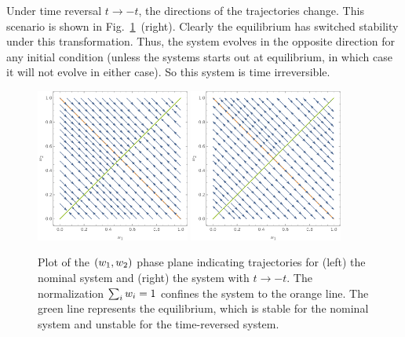 {	Under time reversal $t \to -t$, the directions of the trajectories change.  This scenario is shown in Fig.~\ref{pplane}~(right).  Clearly the equilibrium has switched stability under this transformation.  Thus, the system evolves in the opposite direction for any initial condition (unless the systems starts out at equilibrium, in which case it will not evolve in either case).  So this system is time irreversible.
	
	\begin{figure} \centering
		\includegraphics[width=0.45\textwidth]{1-1(a)} \hfill
		\includegraphics[width=0.45\textwidth]{1-1(b)}
		\caption{Plot of the $(w_1, w_2)$ phase plane indicating trajectories for (left) the nominal system and (right) the system with $t \to -t$.  The normalization $\sum_i w_i = 1$ confines the system to the orange line.  The green line represents the equilibrium, which is stable for the nominal system and unstable for the time-reversed system.}
		\label{pplane}
	\end{figure}
	
}
